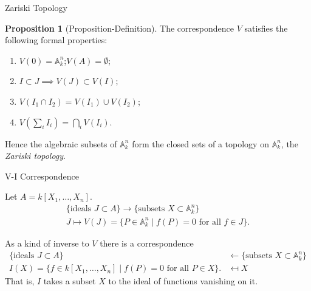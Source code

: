 \documentclass[8pt]{beamer}
\theoremstyle{definition}
\newtheorem{proposition}[theorem]{Proposition}
\begin{document}
    \begin{frame}{Zariski Topology}
        \begin{proposition}[Proposition-Definition] \label{prop:zariski}
            The correspondence $V$ satisfies the following formal properties:
            \begin{enumerate}
            \item[(i)] $V(0) = \mathbb{A}^n_k$;\quad $V(A) = \emptyset$;
            \item[(ii)] $I \subset J \implies V(J) \subset V(I)$;
            \item[(iii)] $V(I_1 \cap I_2) = V(I_1) \cup V(I_2)$;
            \item[(iv)] $V\left(\sum_i I_i\right) = \bigcap_i V(I_i)$.
            \end{enumerate}
            Hence the algebraic subsets of $\mathbb{A}^n_k$ form the closed sets of a topology on $\mathbb{A}^n_k$, the \emph{Zariski topology}.
        \end{proposition}
    \end{frame}


    \begin{frame}{V-I Correspondence}

        Let $A = k[X_1, \dots, X_n]$.
        \begin{align*}
            \{\text{ideals } J \subset A\} \longrightarrow \{\text{subsets } X \subset \mathbb{A}^n_k\}  \\
            J \mapsto V(J) = \{P \in \mathbb{A}^n_k \mid f(P) = 0 \text{ for all } f \in J\}.
        \end{align*}

        As a kind of inverse to $V$ there is a correspondence
        \begin{align*}
            \{\text{ideals } J \subset A\} &\longleftarrow \{\text{subsets } X \subset \mathbb{A}^n_k\} \\
            I(X) = \{f \in k[X_1, \dots, X_n] \mid f(P) = 0 \text{ for all } P \in X\}. &\mapsfrom X
        \end{align*}
        That is, $I$ takes a subset $X$ to the ideal of functions vanishing on it.
    \end{frame}
\end{document}
